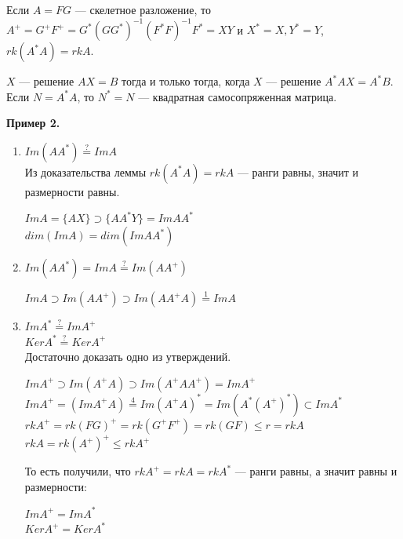 \begin{proposal}
Если $A=FG$ --- скелетное разложение, то 
$A^+=G^+F^+=G^*(GG^*)^{-1}(F^*F)^{-1}F^*=XY$ и 
$X^*=X, Y^*=Y$, 
$rk(A^*A)=rkA$.
\end{proposal}
\begin{statement}
$X$ --- решение $AX=B$ тогда и только тогда, когда $X$ --- решение $A^*AX=A^*B$.\\
Если $N=A^*A$, то $N^*=N$ --- квадратная самосопряженная матрица.
\end{statement}
\textbf{Пример 2.}\begin{enumerate}
    \item $Im(AA^*)\overset{?}{=}ImA$\\
    Из доказательства леммы $rk(A^*A)=rkA$ --- ранги равны, значит и размерности равны.
    \begin{center} $ImA=\{AX\} \supset \{AA^*Y\}=ImAA^*$\\
        $dim(ImA)=dim(ImAA^*)$
    \end{center}
    \item $Im(AA^*)=ImA\overset{?}{=}Im(AA^+)$
    \begin{center}
        $ImA\supset Im(AA^+) \supset Im(AA^+A) \overset{1}{=} ImA$
    \end{center}
    \item $ImA^* \overset{?}{=} ImA^+$\\
    $KerA^* \overset{?}{=} KerA^+$\\
    Достаточно доказать одно из утверждений.
    \begin{center}
        $ImA^+ \supset Im(A^+A) \supset Im(A^+AA^+) = ImA^+$\\
        $ImA^+=(ImA^+A) \overset{4}{=} Im(A^+A)^* = Im(A^*(A^+)^*) \subset ImA^*$\\
        $rkA^+=rk(FG)^+=rk(G^+F^+)=rk(GF) \leqslant r = rkA$\\
        $rkA=rk(A^+)^+ \leqslant rk A^+$
    \end{center}
    То есть получили, что $rkA^+=rkA=rkA^*$ --- ранги равны, а значит равны и размерности:
    \begin{center}
        $ImA^+=ImA^*$\\
        $KerA^+=KerA^*$
    \end{center}
\end{enumerate}
